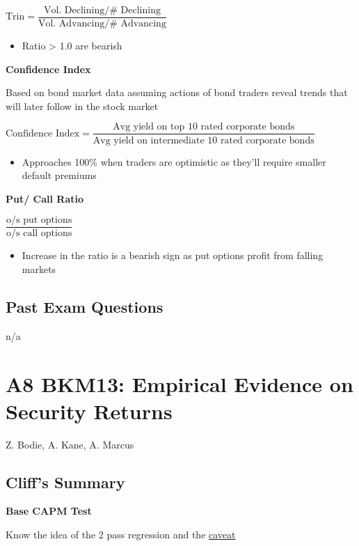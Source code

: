 \documentclass[]{book}
\providecommand{\tightlist}{%
  \setlength{\itemsep}{0pt}\setlength{\parskip}{0pt}}
\theoremstyle{definition}
\theoremstyle{definition}
\theoremstyle{remark}
\begin{document}
\(\text{Trin} = \dfrac{\text{Vol. Declining}/\text{# Declining}}{\text{Vol. Advancing}/\text{# Advancing}}\)

\begin{itemize}
\tightlist
\item
  Ratio \textgreater{} 1.0 are bearish
\end{itemize}

\textbf{Confidence Index}

Based on bond market data assuming actions of bond traders reveal trends
that will later follow in the stock market

\(\text{Confidence Index} = \dfrac{\text{Avg yield on top 10 rated corporate bonds}}{\text{Avg yield on intermediate 10 rated corporate bonds}}\)

\begin{itemize}
\tightlist
\item
  Approaches 100\% when traders are optimistic as they'll require
  smaller default premiums
\end{itemize}

\textbf{Put/ Call Ratio}

\(\dfrac{\text{o/s put options}}{\text{o/s call options}}\)

\begin{itemize}
\tightlist
\item
  Increase in the ratio is a bearish sign as put options profit from
  falling markets
\end{itemize}

\section{Past Exam Questions}\label{past-exam-questions-6}

n/a

\chapter{A8 BKM13: Empirical Evidence on Security
Returns}\label{a8-bkm13-empirical-evidence-on-security-returns}

Z. Bodie, A. Kane, A. Marcus

\section{Cliff's Summary}\label{cliffs-summary-7}

\textbf{Base CAPM Test}

Know the idea of the 2 pass regression and the
\protect\hyperlink{2-pass-caveat}{caveat}
\end{document}
